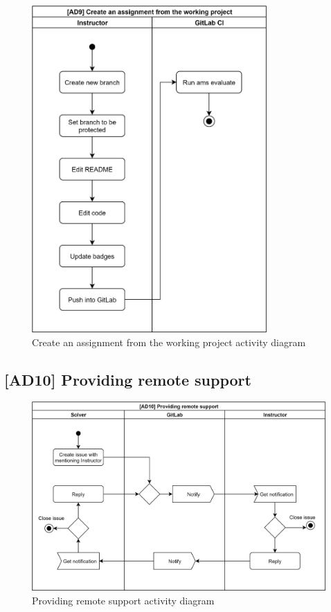 \begin{figure}[H]
    \centering
    \includegraphics[width=0.8\textwidth,height=\textheight,keepaspectratio]{Figures/ad/ad2.png}
    \caption{Create an assignment from the working project activity diagram}
\end{figure}

\subsection{{[}AD10{]} Providing remote support} \label{ssec:ad10}

\begin{figure}[H]
    \centering
    \includegraphics[width=\textwidth,height=\textheight,keepaspectratio]{Figures/ad/ad14.png}
    \caption{Providing remote support activity diagram}
\end{figure}


